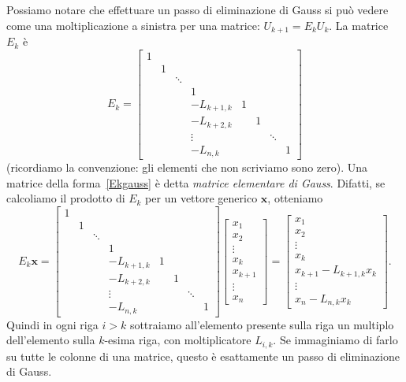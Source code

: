 \documentclass[a4paper]{report}
\theoremstyle{definiton}
\theoremstyle{remark}
\begin{document}
Possiamo notare che effettuare un passo di eliminazione di Gauss si può vedere come una moltiplicazione a sinistra per una matrice: $U_{k+1} = E_k U_k$. La matrice $E_k$ è
\begin{equation} \label{Ekgauss}
E_k = \begin{bmatrix}
    1 \\
    & 1\\
    && \ddots\\
    & & & 1\\
    & & & -L_{k+1,k} & 1\\
    & & & -L_{k+2,k} & & 1\\
    & & & \vdots & & & \ddots \\
    & & & -L_{n,k} & & & & 1
\end{bmatrix}
\end{equation}
(ricordiamo la convenzione: gli elementi che non scriviamo sono zero). Una matrice della forma~\eqref{Ekgauss} è detta \emph{matrice elementare di Gauss}. Difatti, se calcoliamo il prodotto di $E_k$ per un vettore generico $\mathbf{x}$, otteniamo
\[
E_k \mathbf{x} = \begin{bmatrix}
    1 \\
    & 1\\
    && \ddots\\
    & & & 1\\
    & & & -L_{k+1,k} & 1\\
    & & & -L_{k+2,k} & & 1\\
    & & & \vdots & & & \ddots \\
    & & & -L_{n,k} & & & & 1
\end{bmatrix}
\begin{bmatrix}
    x_1\\
    x_2\\
    \vdots\\
    x_k\\
    x_{k+1}\\
    \vdots\\
    x_n
\end{bmatrix} = \begin{bmatrix}
    x_1\\
    x_2\\
    \vdots\\
    x_k\\
    x_{k+1} - L_{k+1,k}x_k\\
    \vdots\\
    x_n - L_{n,k}x_k
\end{bmatrix}.
\]
Quindi in ogni riga $i>k$ sottraiamo all'elemento presente sulla riga un multiplo dell'elemento sulla $k$-esima riga, con moltiplicatore $L_{i,k}$. Se immaginiamo di farlo su tutte le colonne di una matrice, questo è esattamente un passo di eliminazione di Gauss.
\end{document}
